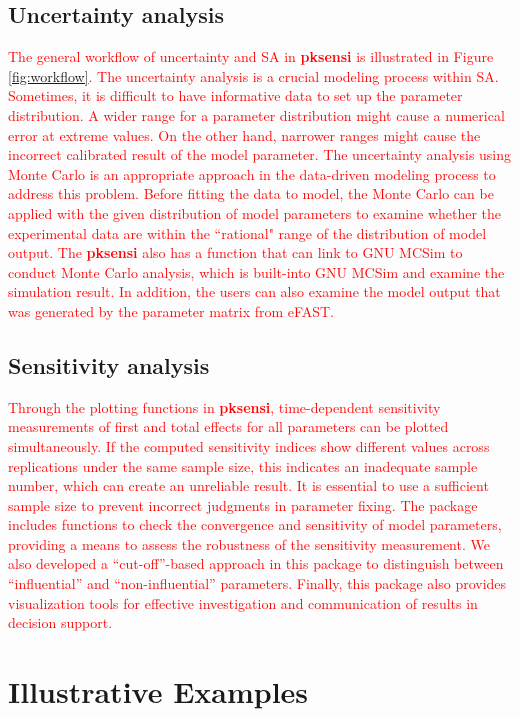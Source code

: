 \documentclass[preprint,12pt, a4paper]{elsarticle}
\begin{document}
\subsection{Uncertainty analysis}

\textcolor{red}{The general workflow of uncertainty and SA in \textbf{pksensi} is illustrated in Figure \ref{fig:workflow}. The uncertainty analysis is a crucial modeling process within SA. Sometimes, it is difficult to have informative data to set up the parameter distribution. A wider range for a parameter distribution might cause a numerical error at extreme values. On the other hand, narrower ranges might cause the incorrect calibrated result of the model parameter. The uncertainty analysis using Monte Carlo is an appropriate approach in the data-driven modeling process to address this problem. Before fitting the data to model, the Monte Carlo can be applied with the given distribution of model parameters to examine whether the experimental data are within the ``rational" range of the distribution of model output. The \textbf{pksensi} also has a function that can link to GNU MCSim to conduct Monte Carlo analysis, which is built-into GNU MCSim and examine the simulation result. In addition, the users can also examine the model output that was generated by the parameter matrix from eFAST.}


\subsection{Sensitivity analysis}

\textcolor{red}{Through the plotting functions in \textbf{pksensi}, time-dependent sensitivity measurements of first and total effects for all parameters can be plotted simultaneously. If the computed sensitivity indices show different values across replications under the same sample size, this indicates an inadequate sample number, which can create an unreliable result. It is essential to use a sufficient sample size to prevent incorrect judgments in parameter fixing. The package includes functions to check the convergence and sensitivity of model parameters, providing a means to assess the robustness of the sensitivity measurement. We also developed a ``cut-off''-based approach in this package to distinguish between ``influential'' and ``non-influential'' parameters. Finally, this package also provides visualization tools for effective investigation and communication of results in decision support.}


\section{Illustrative Examples}
\end{document}
